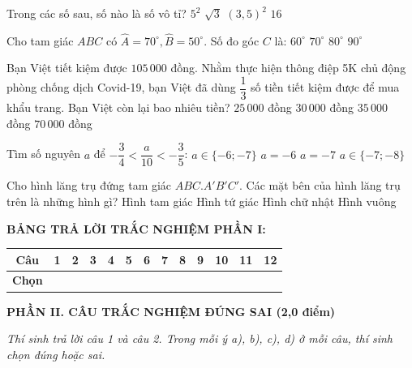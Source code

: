 \documentclass[12pt,a4paper]{article}
\begin{document}
\begin{ex}
Trong các số sau, số nào là số vô tỉ?
\choice
{$5^2$}
{\True $\sqrt{3}$}
{$(3{,}5)^2$}
{$16$}
\end{ex}

\begin{ex}
Cho tam giác $ABC$ có $\widehat{A} = 70^\circ, \widehat{B} = 50^\circ$. Số đo góc $C$ là:
\choice
{\True $60^\circ$}
{$70^\circ$}
{$80^\circ$}
{$90^\circ$}
\end{ex}

\begin{ex}
Bạn Việt tiết kiệm được $105\,000$ đồng. Nhằm thực hiện thông điệp 5K chủ động phòng chống dịch Covid-19, bạn Việt đã dùng $\dfrac{1}{3}$ số tiền tiết kiệm được để mua khẩu trang. Bạn Việt còn lại bao nhiêu tiền?
\choice
{$25\,000$ đồng}
{$30\,000$ đồng}
{$35\,000$ đồng}
{\True $70\,000$ đồng}
\end{ex}

\begin{ex}
Tìm số nguyên $a$ để $-\dfrac{3}{4} < \dfrac{a}{10} < -\dfrac{3}{5}$:
\choice
{$a \in \{-6; -7\}$}
{$a = -6$}
{\True $a = -7$}
{$a \in \{-7; -8\}$}
\end{ex}

\begin{ex}
Cho hình lăng trụ đứng tam giác $ABC.A'B'C'$. Các mặt bên của hình lăng trụ trên là những hình gì?
\choice
{Hình tam giác}
{Hình tứ giác}
{\True Hình chữ nhật}
{Hình vuông}
\end{ex}


\vspace{1mm}
\noindent\textbf{BẢNG TRẢ LỜI TRẮC NGHIỆM PHẦN I:}
\begin{center}
\begin{tabular}{|c|c|c|c|c|c|c|c|c|c|c|c|c|}
\hline
\textbf{Câu} & \textbf{1} & \textbf{2} & \textbf{3} & \textbf{4} & \textbf{5} & \textbf{6} & \textbf{7} & \textbf{8} & \textbf{9} & \textbf{10} & \textbf{11} & \textbf{12} \\
\hline
\textbf{Chọn} & \rule{0pt}{0.55cm} & & & & & & & & & & & \\
\hline
\end{tabular}
\end{center}
\vspace{1mm}

\setcounter{ex}{0}
\noindent\textbf{\large PHẦN II. CÂU TRẮC NGHIỆM ĐÚNG SAI (2,0 điểm)}

\textit{Thí sinh trả lời câu 1 và câu 2. Trong mỗi ý a), b), c), d) ở mỗi câu, thí sinh chọn đúng hoặc sai.}
\end{document}
